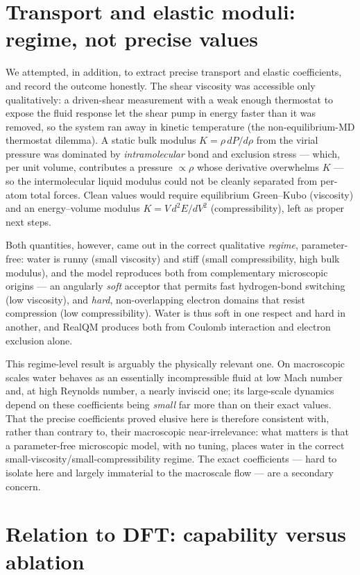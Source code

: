 \documentclass[11pt]{article}
\begin{document}
\section{Transport and elastic moduli: regime, not precise values}

We attempted, in addition, to extract precise transport and elastic coefficients, and record the
outcome honestly. The shear viscosity was accessible only qualitatively: a driven-shear
measurement with a weak enough thermostat to expose the fluid response let the shear pump in energy
faster than it was removed, so the system ran away in kinetic temperature (the non-equilibrium-MD
thermostat dilemma). A static bulk modulus $K=\rho\,dP/d\rho$ from the virial pressure was dominated
by \emph{intramolecular} bond and exclusion stress --- which, per unit volume, contributes a
pressure $\propto\rho$ whose derivative overwhelms $K$ --- so the intermolecular liquid modulus
could not be cleanly separated from per-atom total forces. Clean values would require equilibrium
Green--Kubo (viscosity) and an energy--volume modulus $K=V\,d^2E/dV^2$ (compressibility), left as
proper next steps.

Both quantities, however, came out in the correct qualitative \emph{regime}, parameter-free:
water is runny (small viscosity) and stiff (small compressibility, high bulk modulus), and the
model reproduces both from complementary microscopic origins --- an angularly \emph{soft} acceptor
that permits fast hydrogen-bond switching (low viscosity), and \emph{hard}, non-overlapping electron
domains that resist compression (low compressibility). Water is thus soft in one respect and hard in
another, and RealQM produces both from Coulomb interaction and electron exclusion alone.

This regime-level result is arguably the physically relevant one. On macroscopic scales water
behaves as an essentially incompressible fluid at low Mach number and, at high Reynolds number, a
nearly inviscid one; its large-scale dynamics depend on these coefficients being \emph{small} far
more than on their exact values. That the precise coefficients proved elusive here is therefore
consistent with, rather than contrary to, their macroscopic near-irrelevance: what matters is that a
parameter-free microscopic model, with no tuning, places water in the correct
small-viscosity/small-compressibility regime. The exact coefficients --- hard to isolate here and
largely immaterial to the macroscale flow --- are a secondary concern.

\section{Relation to DFT: capability versus ablation}
\end{document}
